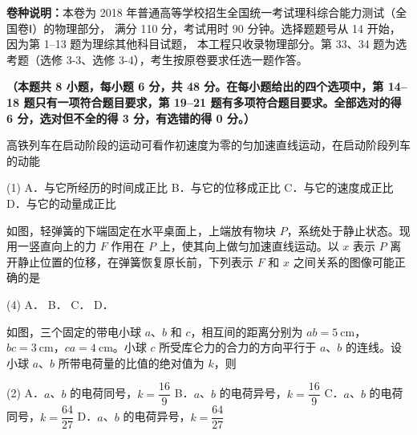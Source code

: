 
\begin{gknotice}
  \textbf{卷种说明：}本卷为 2018 年普通高等学校招生全国统一考试理科综合能力测试（全国卷Ⅰ）的物理部分，
  满分 110 分，考试用时 90 分钟。选择题题号从 14 开始，因为第 1--13 题为理综其他科目试题，
  本工程只收录物理部分。第 33、34 题为选考题（选修 3-3、选修 3-4），考生按原卷要求任选一题作答。
\end{gknotice}


\textbf{（本题共 8 小题，每小题 6 分，共 48 分。在每小题给出的四个选项中，第 14--18 题只有一项符合题目要求，第 19--21 题有多项符合题目要求。全部选对的得 6 分，选对但不全的得 3 分，有选错的得 0 分。）}

\begin{question}
高铁列车在启动阶段的运动可看作初速度为零的匀加速直线运动，在启动阶段列车的动能\gkblank

\begin{gkopts}(1)
  \task A．与它所经历的时间成正比
  \task B．与它的位移成正比
  \task C．与它的速度成正比
  \task D．与它的动量成正比
\end{gkopts}
\end{question}

\begin{question}
如图，轻弹簧的下端固定在水平桌面上，上端放有物块 $P$，系统处于静止状态。现用一竖直向上的力 $F$ 作用在 $P$ 上，使其向上做匀加速直线运动。以 $x$ 表示 $P$ 离开静止位置的位移，在弹簧恢复原长前，下列表示 $F$ 和 $x$ 之间关系的图像可能正确的是\gkblank


\begin{gkopts}(4)
  \task A．
  \task B．
  \task C．
  \task D．
\end{gkopts}
\end{question}

\begin{question}
如图，三个固定的带电小球 $a$、$b$ 和 $c$，相互间的距离分别为 $ab=\SI{5}{\centi\metre}$，$bc=\SI{3}{\centi\metre}$，$ca=\SI{4}{\centi\metre}$。小球 $c$ 所受库仑力的合力的方向平行于 $a$、$b$ 的连线。设小球 $a$、$b$ 所带电荷量的比值的绝对值为 $k$，则\gkblank


\begin{gkopts}(2)
  \task A．$a$、$b$ 的电荷同号，$k=\dfrac{16}{9}$
  \task B．$a$、$b$ 的电荷异号，$k=\dfrac{16}{9}$
  \task C．$a$、$b$ 的电荷同号，$k=\dfrac{64}{27}$
  \task D．$a$、$b$ 的电荷异号，$k=\dfrac{64}{27}$
\end{gkopts}
\end{question}


